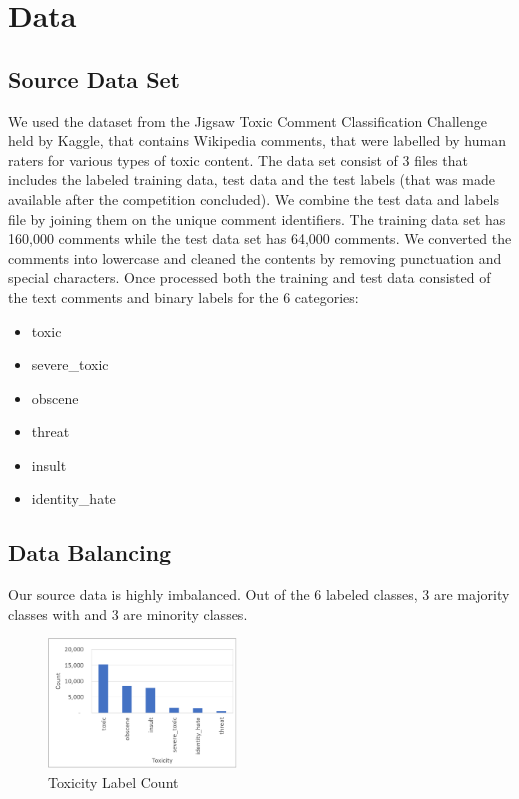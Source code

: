 \documentclass[11pt,a4paper]{article}
\begin{document}
\section{Data}

\subsection{Source Data Set}
We used the dataset from the Jigsaw Toxic Comment Classification Challenge held by Kaggle, that contains Wikipedia comments, that were labelled by human raters for various types of toxic content.  The data set consist of 3 files that includes the labeled training data, test data and the test labels (that was made available after the competition concluded).  We combine the test data and labels file by joining them on the unique comment identifiers. The training data set has 160,000 comments while the test data set has 64,000 comments. We converted the comments into lowercase and cleaned the contents by removing punctuation and special characters. Once processed both the training and test data  consisted of the text comments and binary labels for the 6 categories:

\begin{itemize}
\item toxic
\item severe\_toxic
\item obscene
\item threat
\item insult
\item identity\_hate
\end{itemize}



\subsection{Data Balancing}
Our source data is highly imbalanced. Out of the 6 labeled classes, 3 are majority classes with and 3 are minority classes.


\begin{figure}[h!]
\centering
\includegraphics[width=50mm,scale=0.5]{label_counts.png}
\caption{Toxicity Label Count}
\label{Fig1. label count vs toxicity}
\end{figure}
\end{document}
